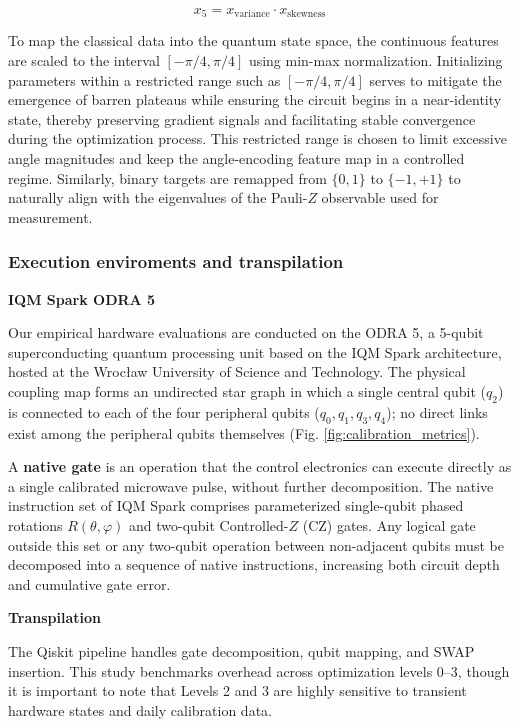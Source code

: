 \documentclass[11pt]{article}
\begin{document}
\begin{equation}
x_5 = x_{\mathrm{variance}} \cdot x_{\mathrm{skewness}}
\end{equation}


To map the classical data into the quantum state space, the continuous features are scaled to the interval $[-\pi/4,\pi/4]$ using min-max normalization. Initializing parameters within a restricted range such as $[-\pi/4,\pi/4]$ serves to mitigate the emergence of barren plateaus while ensuring the circuit begins in a near-identity state, thereby preserving gradient signals and facilitating stable convergence during the optimization process. This restricted range is chosen to limit excessive angle magnitudes and keep the angle-encoding feature map in a controlled regime. Similarly, binary targets are remapped from $\{0,1\}$ to $\{-1,+1\}$ to naturally align with the eigenvalues of the Pauli-$Z$ observable used for measurement.



\subsubsection{Execution enviroments and transpilation}




\textbf{IQM Spark ODRA 5}

Our empirical hardware evaluations are conducted on the ODRA 5, a 5-qubit superconducting quantum processing unit based on the IQM Spark architecture, hosted at the Wrocław University of Science and Technology. The physical coupling map forms an undirected star graph in which a single central qubit (\(q_2\)) is connected to each of the four peripheral qubits (\(q_0, q_1, q_3, q_4\)); no direct links exist among the peripheral qubits themselves (Fig. \ref{fig:calibration_metrics}).

A \textbf{native gate} is an operation that the control electronics can execute directly as a single calibrated microwave pulse, without further decomposition. The native instruction set of IQM Spark comprises parameterized single-qubit phased rotations \(R(\theta, \varphi)\) and two-qubit Controlled-\(Z\) (CZ) gates. Any logical gate outside this set or any two-qubit operation between non-adjacent qubits must be decomposed into a sequence of native instructions, increasing both circuit depth and cumulative gate error. 

\textbf{Transpilation}

The Qiskit pipeline handles gate decomposition, qubit mapping, and SWAP insertion. This study benchmarks overhead across optimization levels 0–3, though it is important to note that Levels 2 and 3 are highly sensitive to transient hardware states and daily calibration data.
\end{document}
